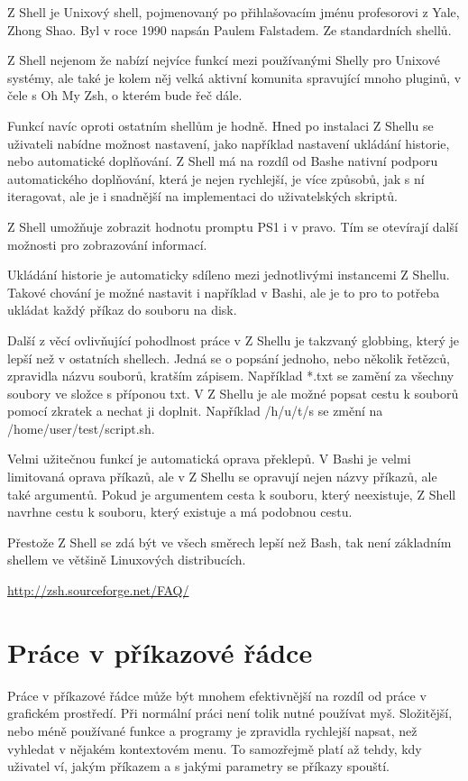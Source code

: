 \documentclass[thesis=M,czech]{FITthesis}[2012/06/26]
\begin{document}
Z Shell je Unixový shell, pojmenovaný po přihlašovacím jménu profesorovi z Yale, Zhong Shao. Byl v roce 1990 napsán Paulem Falstadem. Ze standardních shellů.

Z Shell nejenom že nabízí nejvíce funkcí mezi používanými Shelly pro Unixové systémy, ale také je kolem něj velká aktivní komunita spravující mnoho pluginů, v čele s Oh My Zsh, o kterém bude řeč dále.

Funkcí navíc oproti ostatním shellům je hodně. Hned po instalaci Z Shellu se uživateli nabídne možnost nastavení, jako například nastavení ukládání historie, nebo automatické doplňování. Z Shell má na rozdíl od Bashe nativní podporu automatického doplňování, která je nejen rychlejší, je více způsobů, jak s ní iteragovat, ale je i snadnější na implementaci do uživatelských skriptů.

Z Shell umožňuje zobrazit hodnotu promptu PS1 i v pravo. Tím se otevírají další možnosti pro zobrazování informací.

Ukládání historie je automaticky sdíleno mezi jednotlivými instancemi Z Shellu. Takové chování je možné nastavit i například v Bashi, ale je to pro to potřeba ukládat každý příkaz do souboru na disk.

Další z věcí ovlivňující pohodlnost práce v Z Shellu je takzvaný globbing, který je lepší než v ostatních shellech. Jedná se o popsání jednoho, nebo několik řetězců, zpravidla názvu souborů, kratším zápisem. Například *.txt se zamění za všechny soubory ve složce s příponou txt. V Z Shellu je ale možné popsat cestu k souborů pomocí zkratek a nechat ji doplnit. Například /h/u/t/s se změní na /home/user/test/script.sh.

Velmi užitečnou funkcí je automatická oprava překlepů. V Bashi je velmi limitovaná oprava příkazů, ale v Z Shellu se opravují nejen názvy příkazů, ale také argumentů. Pokud je argumentem cesta k souboru, který neexistuje, Z Shell navrhne cestu k souboru, který existuje a má podobnou cestu.

Přestože Z Shell se zdá být ve všech směrech lepší než Bash, tak není základním shellem ve většině Linuxových distribucích.

\url{http://zsh.sourceforge.net/FAQ/}


%
%
%
\section{Práce v příkazové řádce}

Práce v příkazové řádce může být mnohem efektivnější na rozdíl od práce v grafickém prostředí. Při normální práci není tolik nutné používat myš. Složitější, nebo méně používané funkce a programy je zpravidla rychlejší napsat, než vyhledat v nějakém kontextovém menu. To samozřejmě platí až tehdy, kdy uživatel ví, jakým příkazem a s jakými parametry se příkazy spouští.
\end{document}
